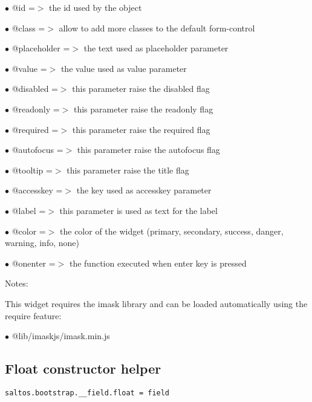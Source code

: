 \documentclass[a4paper]{book}
\begin{document}
\begin{compactitem}
\item[\color{myblue}$\bullet$] @id          =$>$ the id used by the object
\item[\color{myblue}$\bullet$] @class       =$>$ allow to add more classes to the default form-control
\item[\color{myblue}$\bullet$] @placeholder =$>$ the text used as placeholder parameter
\item[\color{myblue}$\bullet$] @value       =$>$ the value used as value parameter
\item[\color{myblue}$\bullet$] @disabled    =$>$ this parameter raise the disabled flag
\item[\color{myblue}$\bullet$] @readonly    =$>$ this parameter raise the readonly flag
\item[\color{myblue}$\bullet$] @required    =$>$ this parameter raise the required flag
\item[\color{myblue}$\bullet$] @autofocus   =$>$ this parameter raise the autofocus flag
\item[\color{myblue}$\bullet$] @tooltip     =$>$ this parameter raise the title flag
\item[\color{myblue}$\bullet$] @accesskey   =$>$ the key used as accesskey parameter
\item[\color{myblue}$\bullet$] @label       =$>$ this parameter is used as text for the label
\item[\color{myblue}$\bullet$] @color       =$>$ the color of the widget (primary, secondary, success, danger, warning, info, none)
\item[\color{myblue}$\bullet$] @onenter     =$>$ the function executed when enter key is pressed
\end{compactitem}

Notes:

This widget requires the imask library and can be loaded automatically using the require
feature:

\begin{compactitem}
\item[\color{myblue}$\bullet$] @lib/imaskjs/imask.min.js
\end{compactitem}

\hypertarget{toc463}{}
\subsection{Float constructor helper}

\begin{lstlisting}
saltos.bootstrap.__field.float = field
\end{lstlisting}
\end{document}
